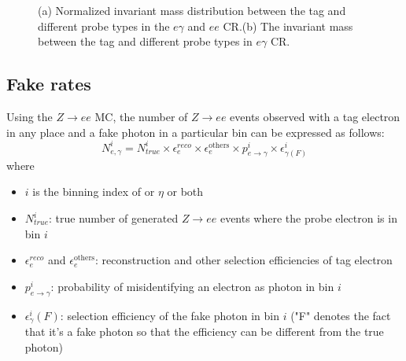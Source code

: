\begin{figure}[!htbp]
\centering
{}
\caption [] {(a) Normalized invariant mass distribution between the tag and different probe types in the $e\gamma$ and $ee$ CR.(b) The invariant mass between the tag and different probe types in $e\gamma$ CR.}
\label{fig:egammafake_tagmass}
\end{figure} 
\FloatBarrier

\subsection{Fake rates}
\label{sec:egammafakes_fr}

Using the $Z\to ee$ MC, the number of $Z\to ee$ events observed with a tag electron in any place and a fake photon in a particular bin can be expressed as follows:
\begin{equation}
N_{e,\gamma}^i = N_{true}^i \times \epsilon_e^{reco} \times \epsilon_e^{\mathrm{others}} \times p_{e\to\gamma}^i \times \epsilon_{\gamma(F)}^i
\end{equation}
where
\begin{itemize}
\item $i$ is the binning index of \pT or $\eta$ or both
\item $N_{true}^i$: true number of generated $Z\to ee$ events where the probe electron is in bin $i$
\item $\epsilon_e^{reco}$ and $\epsilon_e^{\mathrm{others}}$: reconstruction and other selection efficiencies of tag electron
\item $p_{e\to\gamma}^i$: probability of misidentifying an electron as photon in bin $i$
\item $\epsilon_{\gamma}^i(F)$: selection efficiency of the fake photon in bin $i$ ("F" denotes the fact that it's a fake photon so that the efficiency can be different from the true photon)
\end{itemize}

